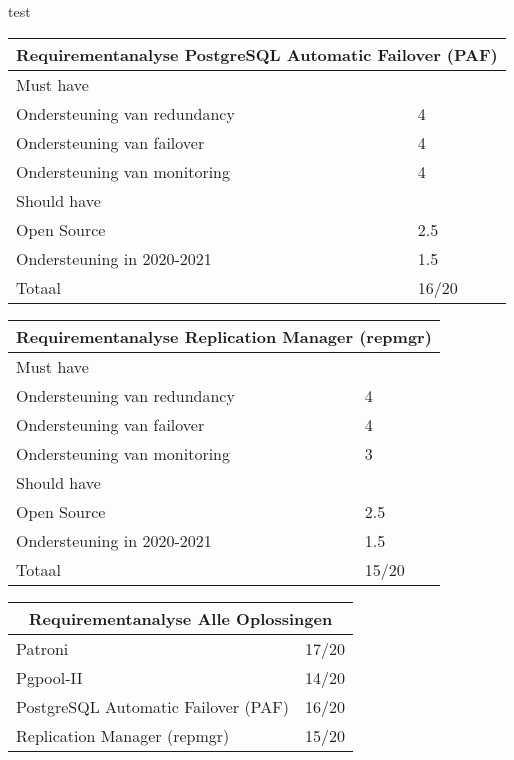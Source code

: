 \caption[Tabel 2: Requirementanalyse Pgpool-II]{test}
\newline

\begin{tabular}{ |p{6cm}||p{6cm}|  }
    \hline
    \multicolumn{2}{|c|}{Requirementanalyse PostgreSQL Automatic Failover (PAF)} \\
    \hline
    Must have & \\
    \hline
    Ondersteuning van redundancy  & 4 \\
    Ondersteuning van failover &  4 \\
    Ondersteuning van monitoring & 4 \\
    \hline
    Should have & \\
    \hline
    Open Source &  2.5 \\
    Ondersteuning in 2020-2021 & 1.5 \\
    \hline
    \hline
    Totaal & 16/20 \\
    \hline
\end{tabular}


\caption[Tabel 3: Requirementanalyse PostgreSQL Automatic Failover (PAF)]
\newline

\begin{tabular}{ |p{6cm}||p{6cm}|  }
    \hline
    \multicolumn{2}{|c|}{Requirementanalyse Replication Manager (repmgr)} \\
    \hline
    Must have & \\
    \hline
    Ondersteuning van redundancy  & 4 \\
    Ondersteuning van failover &  4 \\
    Ondersteuning van monitoring & 3 \\
    \hline
    Should have & \\
    \hline
    Open Source &  2.5 \\
    Ondersteuning in 2020-2021 & 1.5 \\
    \hline
    \hline
    Totaal & 15/20 \\
    \hline
\end{tabular}


\caption[Tabel 4: Requirementanalyse Replication Manager (repmgr)]
\newline



\begin{tabular}{ |p{6cm}||p{6cm}|  }
    \hline
    \multicolumn{2}{|c|}{Requirementanalyse Alle Oplossingen} \\
    \hline
    Patroni & 17/20 \\
    \hline
    Pgpool-II & 14/20 \\
    \hline
    PostgreSQL Automatic Failover (PAF) & 16/20 \\
    \hline
    Replication Manager (repmgr) & 15/20 \\
    \hline
\end{tabular}



